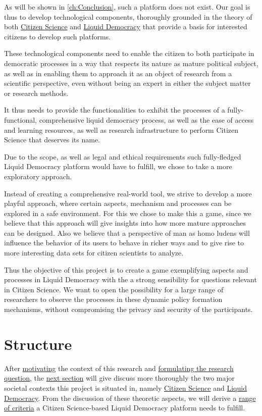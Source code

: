 As will be shown in \ref{ch:Conclusion}, such a platform does not exist. Our goal is thus to develop technological components, thoroughly grounded in the theory of both \hyperref[sec:Theory_CS]{Citizen Science} and \hyperref[sec:Liquid_Democracy]{Liquid Democracy} that provide a basis for interested citizens to develop such platforms.

These technological components need to enable the citizen to both participate in democratic processes in a way that respects its nature as mature political subject, as well as in enabling them to approach it as an object of research from a scientific perspective, even without being an expert in either the subject matter or research methods. 

It thus needs to provide the functionalities to exhibit the processes of a fully-functional, comprehensive liquid democracy process, as well as the ease of access and learning resources, as well as research infrastructure to perform Citizen Science that deserves its name.

Due to the scope, as well as legal and ethical requirements such fully-fledged Liquid Democracy platform would have to fulfill, we chose to take a more exploratory approach. 

Instead of creating a comprehensive real-world tool, we strive to develop a more playful approach, where certain aspects, mechanism and processes can be explored in a safe environment. For this we chose to make this a game, since we believe that this approach will give insights into how more mature approaches can be designed. Also we believe that a perspective of man as homo ludens will influence the behavior of its users to behave in richer ways and to give rise to more interesting data sets for citizen scientists to analyze.

Thus the objective of this project is to create a game exemplifying aspects and processes in Liquid Democracy with the a strong sensibility for questions relevant in Citizen Science. We want to open the possibility for a large range of researchers to observe the processes in these dynamic policy formation mechanisms, without compromising the privacy and security of the participants.

\section{Structure}
\label{sec:structure}


After \hyperref[sec:Motivation]{motivating} the context of this research and \hyperref[sec:Objective]{formulating the research question}, the \hyperref[ch:Theory]{next section} will give discuss more thoroughly the two major societal contexts this project is situated in, namely \hyperref[sec:Theory_CS]{Citizen Science} and \hyperref[sec:Liquid_Democracy]{Liquid Democracy}. From the discussion of these theoretic aspects, we will derive a \hyperref[sec:Criteria]{range of criteria} a Citizen Science-based Liquid Democracy platform needs to fulfill.

